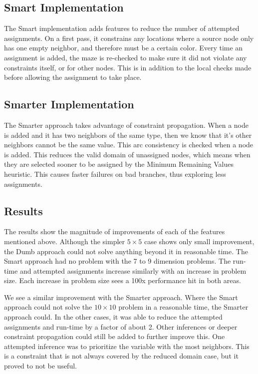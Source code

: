 \documentclass{article}[12pt]
\begin{document}
   \subsection{Smart Implementation}
   The Smart implementation adds features to reduce the number of attempted assignments. On a first pass, it constrains any locations where a source node only has one empty neighbor, and therefore must be a certain color. Every time an assignment is added, the maze is re-checked to make sure it did not violate any constraints itself, or for other nodes. This is in addition to the local checks made before allowing the assignment to take place.
   
   \subsection{Smarter Implementation}
   The Smarter approach takes advantage of constraint propagation. When a node is added and it has two neighbors of the same type, then we know that it's other neighbors cannot be the same value. This arc consistency is checked when a node is added. This reduces the valid domain of unassigned nodes, which means when they are selected sooner to be assigned by the Minimum Remaining Values heuristic. This causes faster failures on bad branches, thus exploring less assignments.
   
   \subsection{Results}
   The results show the magnitude of improvements of each of the features mentioned above. Although the simpler $5 \times 5$ case shows only small improvement, the Dumb approach could not solve anything beyond it in reasonable time. The Smart approach had no problem with the 7 to 9 dimension problems. The run-time and attempted assignments increase similarly with an increase in problem size. Each increase in problem size sees a 100x performance hit in both areas.
   
   We see a similar improvement with the Smarter approach. Where the Smart approach could not solve the $10 \times 10$ problem in a reasonable time, the Smarter approach could. In the other cases, it was able to reduce the attempted assignments and run-time by a factor of about 2. Other inferences or deeper constraint propagation could still be added to further improve this. One attempted inference was to prioritize the variable with the most neighbors. This is a constraint that is not always covered by the reduced domain case, but it proved to not be useful.
   
\end{document}
